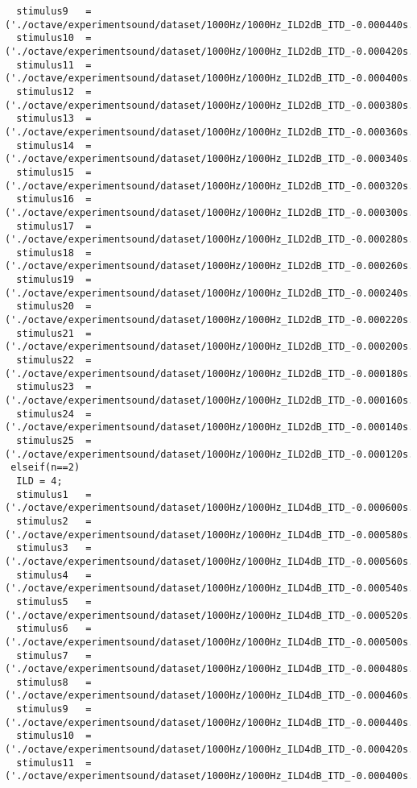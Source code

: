 {\begin{verbatim}
  stimulus9   =('./octave/experimentsound/dataset/1000Hz/1000Hz_ILD2dB_ITD_-0.000440s.wav');
  stimulus10  =('./octave/experimentsound/dataset/1000Hz/1000Hz_ILD2dB_ITD_-0.000420s.wav');
  stimulus11  =('./octave/experimentsound/dataset/1000Hz/1000Hz_ILD2dB_ITD_-0.000400s.wav');
  stimulus12  =('./octave/experimentsound/dataset/1000Hz/1000Hz_ILD2dB_ITD_-0.000380s.wav');
  stimulus13  =('./octave/experimentsound/dataset/1000Hz/1000Hz_ILD2dB_ITD_-0.000360s.wav');
  stimulus14  =('./octave/experimentsound/dataset/1000Hz/1000Hz_ILD2dB_ITD_-0.000340s.wav');
  stimulus15  =('./octave/experimentsound/dataset/1000Hz/1000Hz_ILD2dB_ITD_-0.000320s.wav');
  stimulus16  =('./octave/experimentsound/dataset/1000Hz/1000Hz_ILD2dB_ITD_-0.000300s.wav');
  stimulus17  =('./octave/experimentsound/dataset/1000Hz/1000Hz_ILD2dB_ITD_-0.000280s.wav');
  stimulus18  =('./octave/experimentsound/dataset/1000Hz/1000Hz_ILD2dB_ITD_-0.000260s.wav');
  stimulus19  =('./octave/experimentsound/dataset/1000Hz/1000Hz_ILD2dB_ITD_-0.000240s.wav');
  stimulus20  =('./octave/experimentsound/dataset/1000Hz/1000Hz_ILD2dB_ITD_-0.000220s.wav');
  stimulus21  =('./octave/experimentsound/dataset/1000Hz/1000Hz_ILD2dB_ITD_-0.000200s.wav');
  stimulus22  =('./octave/experimentsound/dataset/1000Hz/1000Hz_ILD2dB_ITD_-0.000180s.wav');
  stimulus23  =('./octave/experimentsound/dataset/1000Hz/1000Hz_ILD2dB_ITD_-0.000160s.wav');
  stimulus24  =('./octave/experimentsound/dataset/1000Hz/1000Hz_ILD2dB_ITD_-0.000140s.wav');
  stimulus25  =('./octave/experimentsound/dataset/1000Hz/1000Hz_ILD2dB_ITD_-0.000120s.wav');
 elseif(n==2)
  ILD = 4;
  stimulus1   =('./octave/experimentsound/dataset/1000Hz/1000Hz_ILD4dB_ITD_-0.000600s.wav');
  stimulus2   =('./octave/experimentsound/dataset/1000Hz/1000Hz_ILD4dB_ITD_-0.000580s.wav');
  stimulus3   =('./octave/experimentsound/dataset/1000Hz/1000Hz_ILD4dB_ITD_-0.000560s.wav');
  stimulus4   =('./octave/experimentsound/dataset/1000Hz/1000Hz_ILD4dB_ITD_-0.000540s.wav');
  stimulus5   =('./octave/experimentsound/dataset/1000Hz/1000Hz_ILD4dB_ITD_-0.000520s.wav');
  stimulus6   =('./octave/experimentsound/dataset/1000Hz/1000Hz_ILD4dB_ITD_-0.000500s.wav');
  stimulus7   =('./octave/experimentsound/dataset/1000Hz/1000Hz_ILD4dB_ITD_-0.000480s.wav');
  stimulus8   =('./octave/experimentsound/dataset/1000Hz/1000Hz_ILD4dB_ITD_-0.000460s.wav');
  stimulus9   =('./octave/experimentsound/dataset/1000Hz/1000Hz_ILD4dB_ITD_-0.000440s.wav');
  stimulus10  =('./octave/experimentsound/dataset/1000Hz/1000Hz_ILD4dB_ITD_-0.000420s.wav');
  stimulus11  =('./octave/experimentsound/dataset/1000Hz/1000Hz_ILD4dB_ITD_-0.000400s.wav');

\end{verbatim}}
